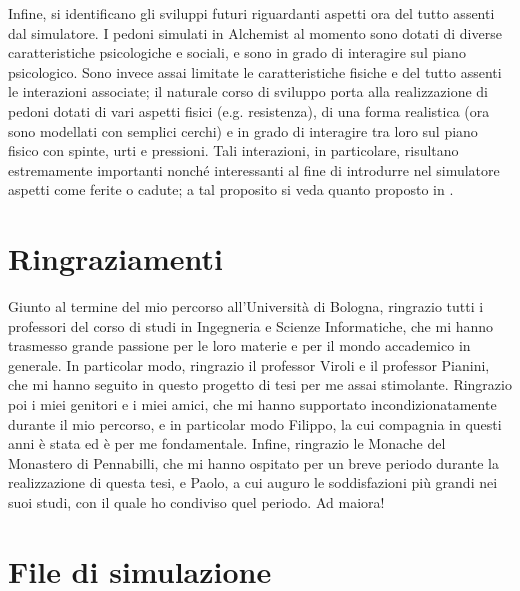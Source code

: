 \documentclass[12pt,a4paper,openright,oneside]{book}
\begin{document}
Infine, si identificano gli sviluppi futuri riguardanti aspetti ora del tutto assenti dal simulatore. I pedoni simulati in Alchemist al momento sono dotati di diverse caratteristiche psicologiche e sociali, e sono in grado di interagire sul piano psicologico. Sono invece assai limitate le caratteristiche fisiche e del tutto assenti le interazioni associate; il naturale corso di sviluppo porta alla realizzazione di pedoni dotati di vari aspetti fisici (e.g. resistenza), di una forma realistica (ora sono modellati con semplici cerchi) e in grado di interagire tra loro sul piano fisico con spinte, urti e pressioni. Tali interazioni, in particolare, risultano estremamente importanti nonché interessanti al fine di introdurre nel simulatore aspetti come ferite o cadute; a tal proposito si veda quanto proposto in \cite{Pelechano2007}.





\chapter*{Ringraziamenti}
Giunto al termine del mio percorso all'Università di Bologna, ringrazio tutti i professori del corso di studi in Ingegneria e Scienze Informatiche, che mi hanno trasmesso grande passione per le loro materie e per il mondo accademico in generale. In particolar modo, ringrazio il professor Viroli e il professor Pianini, che mi hanno seguito in questo progetto di tesi per me assai stimolante. Ringrazio poi i miei genitori e i miei amici, che mi hanno supportato incondizionatamente durante il mio percorso, e in particolar modo Filippo, la cui compagnia in questi anni è stata ed è per me fondamentale. Infine, ringrazio le Monache del Monastero di Pennabilli, che mi hanno ospitato per un breve periodo durante la realizzazione di questa tesi, e Paolo, a cui auguro le soddisfazioni più grandi nei suoi studi, con il quale ho condiviso quel periodo. Ad maiora!

\appendix
\chapter{File di simulazione}
\end{document}
